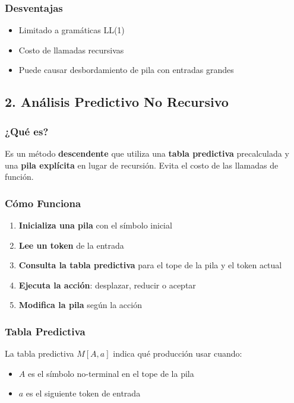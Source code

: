 \documentclass[12pt]{article}
\begin{document}
\subsubsection{Desventajas}

\begin{itemize}
    \item Limitado a gramáticas LL(1)
    \item Costo de llamadas recursivas
    \item Puede causar desbordamiento de pila con entradas grandes
\end{itemize}


\subsection{2. Análisis Predictivo No Recursivo}

\subsubsection{¿Qué es?}

Es un método \textbf{descendente} que utiliza una \textbf{tabla predictiva} precalculada y una \textbf{pila explícita} en lugar de recursión. Evita el costo de las llamadas de función.

\subsubsection{Cómo Funciona}

\begin{enumerate}
    \item \textbf{Inicializa una pila} con el símbolo inicial
    \item \textbf{Lee un token} de la entrada
    \item \textbf{Consulta la tabla predictiva} para el tope de la pila y el token actual
    \item \textbf{Ejecuta la acción}: desplazar, reducir o aceptar
    \item \textbf{Modifica la pila} según la acción
\end{enumerate}

\subsubsection{Tabla Predictiva}

La tabla predictiva $M[A, a]$ indica qué producción usar cuando:
\begin{itemize}
    \item $A$ es el símbolo no-terminal en el tope de la pila
    \item $a$ es el siguiente token de entrada
\end{itemize}
\end{document}

